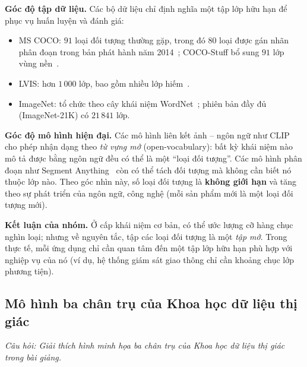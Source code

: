 \textbf{Góc độ tập dữ liệu.} Các bộ dữ liệu chỉ định nghĩa một tập lớp hữu hạn để phục vụ huấn luyện và đánh giá:
\begin{itemize}
    \item MS COCO: $91$ loại đối tượng thường gặp, trong đó $80$ loại được gán nhãn phân đoạn trong bản phát hành năm 2014~\citep{lin2014microsoft}; COCO-Stuff bổ sung $91$ lớp vùng nền~\citep{caesar2018coco}.
    \item LVIS: hơn $1\,000$ lớp, bao gồm nhiều lớp hiếm~\citep{gupta2019lvis}.
    \item ImageNet: tổ chức theo cây khái niệm WordNet~\citep{deng2009imagenet}; phiên bản đầy đủ (ImageNet-21K) có $21\,841$ lớp.
\end{itemize}

\textbf{Góc độ mô hình hiện đại.} Các mô hình liên kết ảnh -- ngôn ngữ như CLIP~\citep{radford2021learning} cho phép nhận dạng theo \emph{từ vựng mở} (open-vocabulary): bất kỳ khái niệm nào mô tả được bằng ngôn ngữ đều có thể là một ``loại đối tượng''. Các mô hình phân đoạn như Segment Anything~\citep{kirillov2023segment} còn có thể tách đối tượng mà không cần biết nó thuộc lớp nào. Theo góc nhìn này, số loại đối tượng là \textbf{không giới hạn} và tăng theo sự phát triển của ngôn ngữ, công nghệ (mỗi sản phẩm mới là một loại đối tượng mới).

\textbf{Kết luận của nhóm.} Ở cấp khái niệm cơ bản, có thể ước lượng cỡ hàng chục nghìn loại; nhưng về nguyên tắc, tập các loại đối tượng là một \emph{tập mở}. Trong thực tế, mỗi ứng dụng chỉ cần quan tâm đến một tập lớp hữu hạn phù hợp với nghiệp vụ của nó (ví dụ, hệ thống giám sát giao thông chỉ cần khoảng chục lớp phương tiện).

\subsection{Mô hình ba chân trụ của Khoa học dữ liệu thị giác}
\label{subsec:w1_threepillars}

\textit{Câu hỏi: Giải thích hình minh họa ba chân trụ của Khoa học dữ liệu thị giác trong bài giảng.}

